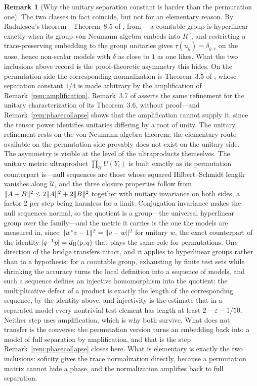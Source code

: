 \documentclass[11pt]{amsart}
\theoremstyle{definition}
\newtheorem{remark}[theorem]{Remark}
\theoremstyle{plain}
\newcommand{\eps}{\varepsilon}
\newcommand{\distH}{d_{\mathrm H}}
\DeclarePairedDelimiter{\abs}{\lvert}{\rvert}
\DeclarePairedDelimiter{\norm}{\lVert}{\rVert}
\begin{document}
\begin{remark}[Why the unitary separation constant is harder than the permutation one]
The two classes in fact coincide, but not for an elementary reason.  By Radulescu's theorem---Theorem~8.5 of \cite{Pestov08}, from \cite{Radulescu08}---a countable group is hyperlinear exactly when its group von Neumann algebra embeds into \(R^\omega\), and restricting a trace-preserving embedding to the group unitaries gives \(\tau(u_g)=\delta_{g,e}\) on the nose, hence non-scalar models with \(\delta\) as close to \(1\) as one likes.  What the two inclusions above record is the proof-theoretic asymmetry this hides.  On the permutation side the corresponding normalization is Theorem~3.5 of \cite{Pestov08}, whose separation constant \(1/4\) is made arbitrary by the amplification of Remark~\ref{rem:amplification}.  Remark~3.7 of \cite{Pestov08} asserts the same refinement for the unitary characterization of its Theorem~3.6, without proof---and Remark~\ref{rem:phasecollapse} shows that the amplification cannot supply it, since the tensor power identifies unitaries differing by a root of unity.  The unitary refinement rests on the von Neumann algebra theorem; the elementary route available on the permutation side provably does not exist on the unitary side.  The asymmetry is visible at the level of the ultraproducts themselves.  The unitary metric ultraproduct \(\prod_{\mathcal U}U(Y_i)\) is built exactly as its permutation counterpart is---null sequences are those whose squared Hilbert--Schmidt length vanishes along \(\mathcal U\), and the three closure properties follow from \(\norm{A+B}^2\leq2\norm A^2+2\norm B^2\) together with unitary invariance on both sides, a factor \(2\) per step being harmless for a limit.  Conjugation invariance makes the null sequences normal, so the quotient is a group---the universal hyperlinear group over the family---and the metric it carries is the one the models are measured in, since \(\norm{w^{*}v-1}^2=\norm{v-w}^2\) for unitary \(w\), the exact counterpart of the identity \(\abs{q^{-1}p}=\distH(p,q)\) that plays the same role for permutations.  One direction of the bridge transfers intact, and it applies to hyperlinear groups rather than to a hypothesis: for a countable group, exhausting by finite test sets while shrinking the accuracy turns the local definition into a sequence of models, and such a sequence defines an injective homomorphism into the quotient: the multiplicative defect of a product is exactly the length of the corresponding sequence, by the identity above, and injectivity is the estimate that in a separated model every nontrivial test element has length at least \(2-\eps-1/50\).  Neither step uses amplification, which is why both survive.  What does not transfer is the converse: the permutation version turns an embedding back into a model of full separation by amplification, and that is the step Remark~\ref{rem:phasecollapse} closes here.  What is elementary is exactly the two inclusions: soficity gives the trace normalization directly, because a permutation matrix cannot hide a phase, and the normalization amplifies back to full separation.
\end{remark}
\end{document}
